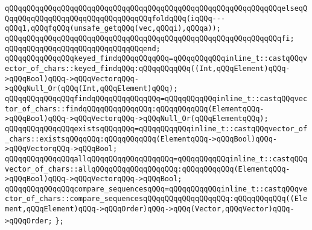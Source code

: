\verb|qQQqqQQqqQQqqQQqqQQqqQQqqQQqqQQqqQQqqQQqqQQqqQQqqQQqqQQqqQQqqQQqelseqQQqqQQqqQQqqQQqqQQqqQQqqQQqqQQqqQQqfoldqQQq(iqQQq---qQQq1,qQQqfqQQq(unsafe_getqQQq(vec,qQQqi),qQQqa));|\newline
\verb|qQQqqQQqqQQqqQQqqQQqqQQqqQQqqQQqqQQqqQQqqQQqqQQqqQQqqQQqqQQqqQQqfi;|\newline
\verb|qQQqqQQqqQQqqQQqqQQqqQQqqQQqqQQqend;|\newline
\newline
\newline
\verb|qQQqqQQqqQQqqQQqkeyed_findqQQqqQQqqQQq=qQQqqQQqqQQqinline_t::castqQQqvector_of_chars::keyed_findqQQq:qQQqqQQqqQQq((Int,qQQqElement)qQQq->qQQqBool)qQQq->qQQqVectorqQQq->qQQqNull_Or(qQQq(Int,qQQqElement)qQQq);|\newline
\newline
\verb|qQQqqQQqqQQqqQQqfindqQQqqQQqqQQqqQQq=qQQqqQQqqQQqinline_t::castqQQqvector_of_chars::findqQQqqQQqqQQqqQQq:qQQqqQQqqQQq(ElementqQQq->qQQqBool)qQQq->qQQqVectorqQQq->qQQqNull_Or(qQQqElementqQQq);|\newline
\newline
\verb|qQQqqQQqqQQqqQQqexistsqQQqqQQq=qQQqqQQqqQQqinline_t::castqQQqvector_of_chars::existsqQQqqQQq:qQQqqQQqqQQq(ElementqQQq->qQQqBool)qQQq->qQQqVectorqQQq->qQQqBool;|\newline
\newline
\verb|qQQqqQQqqQQqqQQqallqQQqqQQqqQQqqQQqqQQq=qQQqqQQqqQQqinline_t::castqQQqvector_of_chars::allqQQqqQQqqQQqqQQqqQQq:qQQqqQQqqQQq(ElementqQQq->qQQqBool)qQQq->qQQqVectorqQQq->qQQqBool;|\newline
\newline
\verb|qQQqqQQqqQQqqQQqcompare_sequencesqQQq=qQQqqQQqqQQqinline_t::castqQQqvector_of_chars::compare_sequencesqQQqqQQqqQQqqQQqqQQq:qQQqqQQqqQQq((Element,qQQqElement)qQQq->qQQqOrder)qQQq->qQQq(Vector,qQQqVector)qQQq->qQQqOrder;|\newline
\verb|};|\newline
\newline
\newline
\newline

